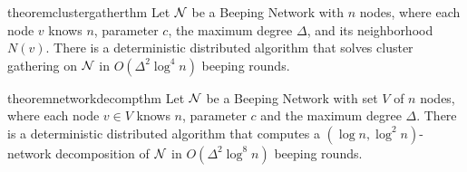 \vspace*{-1.5ex}
\begin{restatable}[]{theorem}{clustergatherthm} %
\label{th:cluster_gathering}
    Let $\mathcal{N}$ be a Beeping Network with %
    $n$ nodes, where each node 
    $v$
    knows $n$, parameter $c$, the maximum degree $\Delta$, and its neighborhood $N(v)$.
    There is a deterministic distributed algorithm that solves cluster gathering on $\mathcal{N}$ in $O(\Delta^2 \log^4 n)$ beeping rounds.
\end{restatable}


\vspace*{-1.5ex}
\begin{restatable}[]{theorem}{networkdecompthm} %
\label{thm:local-decomposition}
    Let $\mathcal{N}$ be a Beeping Network with set $V$ of $n$ nodes, where each node $v\in V$ knows $n$, parameter $c$ and the maximum degree $\Delta$.
    There is a deterministic distributed algorithm that computes a $(\log n, \log^2 n)$-network decomposition of $\mathcal{N}$ in $O(\Delta^2 \log^8 n)$ beeping rounds.
\end{restatable}

